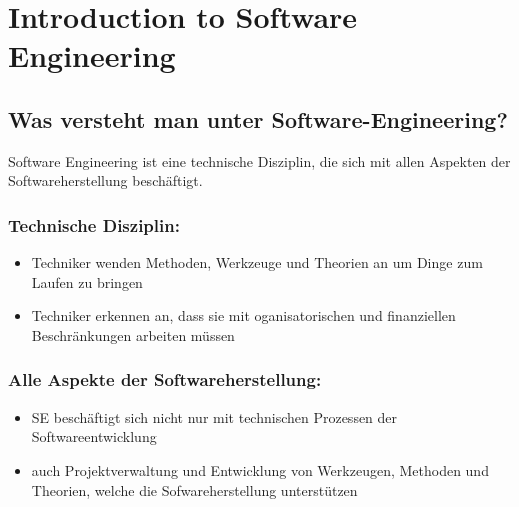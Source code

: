 \chapter{Introduction to Software Engineering}
\section{Was versteht man unter Software-Engineering?}
Software Engineering ist eine technische Disziplin, die sich mit allen Aspekten der Softwareherstellung beschäftigt.
\subsection{Technische Disziplin:}
\begin{itemize}
    \item Techniker wenden Methoden, Werkzeuge und Theorien an um Dinge zum Laufen zu bringen
    \item Techniker erkennen an, dass sie mit oganisatorischen und finanziellen Beschränkungen arbeiten müssen
\end{itemize}
\subsection{Alle Aspekte der Softwareherstellung:}
\begin{itemize}
    \item SE beschäftigt sich nicht nur mit technischen Prozessen der Softwareentwicklung
    \item auch Projektverwaltung und Entwicklung von Werkzeugen, Methoden und Theorien, welche die Sofwareherstellung unterstützen
\end{itemize}
